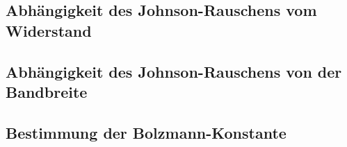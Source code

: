 \subsection{Abhängigkeit des Johnson-Rauschens vom Widerstand}
\subsection{Abhängigkeit des Johnson-Rauschens von der Bandbreite}
\subsection{Bestimmung der Bolzmann-Konstante}